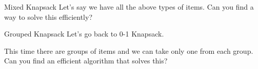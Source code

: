 \documentclass{beamer}
\begin{document}
\begin{frame}{}
\end{frame}
\begin{frame}{}
\end{frame}

\begin{frame}{Mixed Knapsack}
Let's say we have all the above types of items. Can you find a way to solve this efficiently?
\end{frame}

\begin{frame}{}
\end{frame}
\begin{frame}{}
\end{frame}

\begin{frame}{Grouped Knapsack}
Let's go back to 0-1 Knapsack.

\medskip
This time there are groups of items and we can take only one from each group. Can you find an efficient algorithm that solves this?
\end{frame}

\begin{frame}{}
\end{frame}
\begin{frame}{}
\end{frame}
\end{document}
